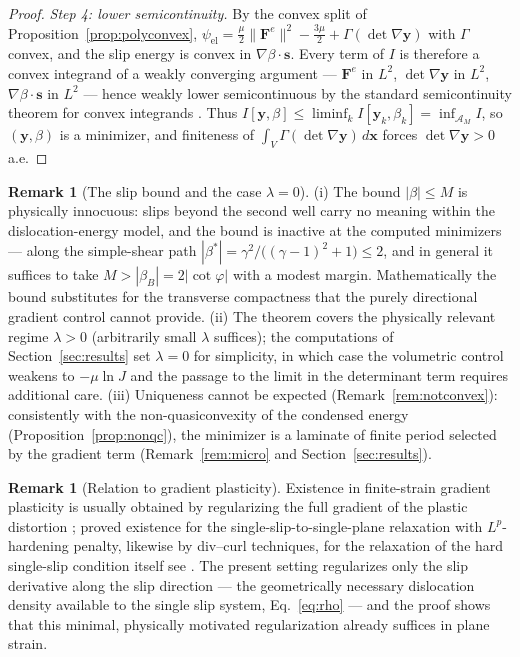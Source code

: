 \documentclass[12pt]{article}
\theoremstyle{plain}
\theoremstyle{definition}
\newtheorem{remark}[theorem]{Remark}
\newcommand{\bF}{\bm{F}}
\newcommand{\bs}{\bm{s}}
\newcommand{\by}{\bm{y}}
\newcommand{\bx}{\bm{x}}
\newcommand{\Fe}{\bF^{e}}
\begin{document}
\begin{proof}
\emph{Step 4: lower semicontinuity.} By the convex split of
Proposition~\ref{prop:polyconvex},
$\psi_{\mathrm{el}}=\tfrac{\mu}{2}\|\Fe\|^{2}-\tfrac{3\mu}{2}
+\Gamma(\det\nabla\by)$ with $\Gamma$ convex, and the slip energy is convex in
$\nabla\beta\cdot\bs$. Every term of $I$ is therefore a convex integrand of a
weakly converging argument --- $\Fe$ in $L^{2}$, $\det\nabla\by$ in $L^{2}$,
$\nabla\beta\cdot\bs$ in $L^{2}$ --- hence weakly lower semicontinuous by the
standard semicontinuity theorem for convex integrands
\citep{dacorogna2008direct}. Thus $I[\by,\beta]\le\liminf_{k}
I[\by_{k},\beta_{k}]=\inf_{\mathcal{A}_{M}}I$, so $(\by,\beta)$ is a
minimizer, and finiteness of $\int_{V}\Gamma(\det\nabla\by)\,d\bx$ forces
$\det\nabla\by>0$ a.e.
\end{proof}

\begin{remark}[The slip bound and the case $\lambda=0$]\label{rem:slipbound}
(i) The bound $|\beta|\le M$ is physically innocuous: slips beyond the second
well carry no meaning within the dislocation-energy model, and the bound is
inactive at the computed minimizers --- along the simple-shear path
$|\beta^{\ast}|=\gamma^{2}/\bigl((\gamma-1)^{2}+1\bigr)\le2$, and in general it
suffices to take $M>|\beta_{B}|=2|\cot\varphi|$ with a modest margin.
Mathematically the bound substitutes for the transverse compactness that the
purely directional gradient control cannot provide. (ii) The theorem covers
the physically relevant regime $\lambda>0$ (arbitrarily small $\lambda$
suffices); the computations of Section~\ref{sec:results} set $\lambda=0$ for
simplicity, in which case the volumetric control weakens to $-\mu\ln J$ and
the passage to the limit in the determinant term requires additional care.
(iii) Uniqueness cannot be expected (Remark~\ref{rem:notconvex}): consistently
with the non-quasiconvexity of the condensed energy
(Proposition~\ref{prop:nonqc}), the minimizer is a laminate of finite period
selected by the gradient term (Remark~\ref{rem:micro} and
Section~\ref{sec:results}).
\end{remark}

\begin{remark}[Relation to gradient plasticity]\label{rem:existence-lit}
Existence in finite-strain gradient plasticity is usually obtained by
regularizing the full gradient of the plastic distortion
\citep{mainik2009global}; \cite{anguige2018existence} proved existence for the single-slip-to-single-plane relaxation with $L^{p}$-hardening penalty, likewise by div--curl techniques, for the relaxation of the hard single-slip condition itself see \citep{anguige2014relaxation}. The present setting regularizes only the slip derivative along the slip direction --- the geometrically necessary dislocation density available to the single slip system, Eq.~\eqref{eq:rho} --- and the proof shows that this minimal, physically motivated regularization already suffices in plane strain.
\end{remark}
\end{document}
